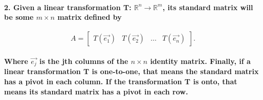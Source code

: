 \documentclass{report}
\begin{document}
\begin{multicols}{2}
\paragraph{2. Given a linear transformation T: $ \mathbb{R}^{ n } \to \mathbb{R}^{ m } $, its standard matrix will be some $ m \times n $ matrix defined by}
\[
	A = \begin{bmatrix} T\left( \vec{ e_1 } \right) & T\left( \vec{ e_2 } \right) & \ldots & T\left( \vec{ e_n } \right)  \end{bmatrix} 
.\] 
\paragraph{Where $ \vec{ e_j } $ is the jth columns of the $ n \times n $ identity matrix. Finally, if a linear transformation T is one-to-one, that means the standard matrix has a pivot in each column. If the transformation T is onto, that means its standard matrix has a pivot in each row. }

\newpage
\end{multicols}
\end{document}
